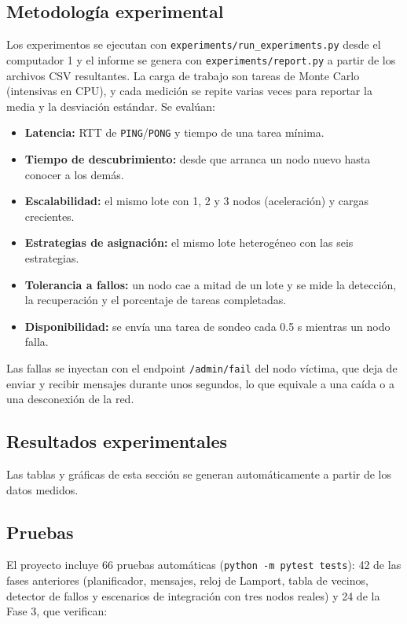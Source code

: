 \subsection{Metodología experimental}

Los experimentos se ejecutan con \texttt{experiments/run\_experiments.py} desde el computador 1 y el
informe se genera con \texttt{experiments/report.py} a partir de los archivos CSV resultantes. La carga
de trabajo son tareas de Monte Carlo (intensivas en CPU), y cada medición se repite varias veces para
reportar la media y la desviación estándar. Se evalúan:

\begin{itemize}
\item \textbf{Latencia:} RTT de \texttt{PING}/\texttt{PONG} y tiempo de una tarea mínima.
\item \textbf{Tiempo de descubrimiento:} desde que arranca un nodo nuevo hasta conocer a los demás.
\item \textbf{Escalabilidad:} el mismo lote con 1, 2 y 3 nodos (aceleración) y cargas crecientes.
\item \textbf{Estrategias de asignación:} el mismo lote heterogéneo con las seis estrategias.
\item \textbf{Tolerancia a fallos:} un nodo cae a mitad de un lote y se mide la detección, la
recuperación y el porcentaje de tareas completadas.
\item \textbf{Disponibilidad:} se envía una tarea de sondeo cada 0.5 s mientras un nodo falla.
\end{itemize}

Las fallas se inyectan con el endpoint \texttt{/admin/fail} del nodo víctima, que deja de enviar y
recibir mensajes durante unos segundos, lo que equivale a una caída o a una desconexión de la red.

\subsection{Resultados experimentales}

Las tablas y gráficas de esta sección se generan automáticamente a partir de los datos medidos.



\subsection{Pruebas}

El proyecto incluye 66 pruebas automáticas (\texttt{python -m pytest tests}): 42 de las fases anteriores
(planificador, mensajes, reloj de Lamport, tabla de vecinos, detector de fallos y escenarios de
integración con tres nodos reales) y 24 de la Fase 3, que verifican:


